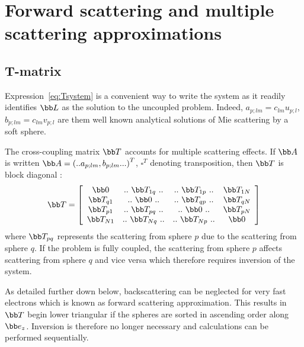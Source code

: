 \section{Forward scattering and multiple scattering approximations}
%
\subsection{T-matrix}
Expression~\eqref{eq:Tsystem} is a convenient way to write the system as it
readily identifies $\bb L$ as the solution to the uncoupled problem.
Indeed,
$a_{p;lm}=c_{lm}u_{p;l}$,
$b_{p;lm}=c_{lm}v_{p;l}$
are them well known analytical solutions of Mie scattering by a soft sphere.

The cross-coupling matrix $\bb T$ accounts for multiple scattering effects.
If $\bb A$ is written $\bb A=\left(..a_{p;lm},b_{p;lm}...\right)^T$,
$\square^T$ denoting transposition, then $\bb T$ is block diagonal :
%
\begin{equation*}
  \bb T =\left[
    \begin{array}{cccc}
      \bb 0      & ..~\bb T_{1q}~.. & ..~\bb T_{1p}~.. & \bb T_{1N}\\
      \bb T_{q1} & ..~\bb 0     ~.. & ..~\bb T_{qp}~.. & \bb T_{qN}\\
      \bb T_{p1} & ..~\bb T_{pq}~.. & ..~\bb 0     ~.. & \bb T_{pN}\\
      \bb T_{N1} & ..~\bb T_{Nq}~.. & ..~\bb T_{Np}~.. & \bb 0     \\
    \end{array}\right]
\end{equation*}
%
where $\bb T_{pq}$ represents the scattering from sphere $p$ due to the
scattering from sphere $q$. If the problem is fully coupled, the scattering
from sphere $p$ affects scattering from sphere $q$ and vice versa which
therefore requires inversion of the system.

As detailed further down below, backscattering can be neglected for very
fast electrons which is known as forward scattering approximation. This results
in $\bb T$ begin lower triangular if the spheres are sorted in ascending
order along $\bb e_z$. Inversion is therefore no longer necessary and
calculations can be performed sequentially.

